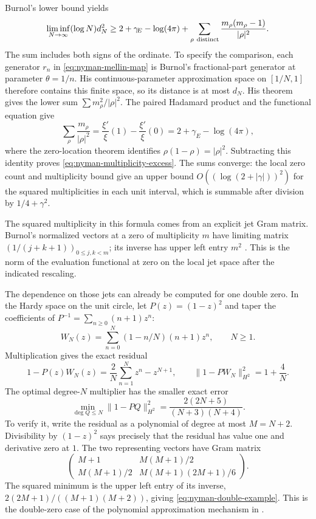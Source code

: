 Burnol's lower bound \cite[Theorem~1.3, p.~4; Section~5,
pp.~14--16]{burnol2002} yields
\begin{equation}\label{eq:nyman-multiplicity-excess}
 \liminf_{N\to\infty}(\log N)d_N^2
 \ge 2+\gamma_{\!E}-\log(4\pi)
   +\sum_{\rho\ {\rm distinct}}
       \frac{m_\rho(m_\rho-1)}{|\rho|^2}.
\end{equation}
The sum includes both signs of the ordinate. To specify the
comparison, each generator \(r_n\) in \eqref{eq:nyman-mellin-map}
is Burnol's fractional-part generator at parameter \(\theta=1/n\).
His continuous-parameter approximation space on \([1/N,1]\)
therefore contains this finite space, so its distance is at most
\(d_N\). His theorem gives the lower sum
\(\sum m_\rho^2/|\rho|^2\). The paired Hadamard product and the
functional equation give
\[
 \sum_\rho\frac{m_\rho}{|\rho|^2}
 =\frac{\xi'}\xi(1)-\frac{\xi'}\xi(0)
 =2+\gamma_{\!E}-\log(4\pi),
\]
where the zero-location theorem identifies
\(\rho(1-\rho)=|\rho|^2\). Subtracting this identity proves
\eqref{eq:nyman-multiplicity-excess}. The sums converge: the
local zero count and multiplicity bound give an upper bound
\(O((\log(2+|\gamma|))^2)\) for the squared multiplicities in
each unit interval, which is summable after division by
\(1/4+\gamma^2\).

The squared multiplicity in this formula comes from an explicit
jet Gram matrix. Burnol's normalized vectors at a zero of
multiplicity \(m\) have limiting matrix
\((1/(j+k+1))_{0\le j,k<m}\); its inverse has upper left entry
\(m^2\) \cite[Theorems~5.3--5.5, pp.~14--16]{burnol2002}.
This is the norm of the evaluation functional at zero on the
local jet space after the indicated rescaling.

The dependence on those jets can already be computed for one
double zero. In the Hardy space on the unit circle, let
\(P(z)=(1-z)^2\) and taper the coefficients of
\(P^{-1}=\sum_{n\ge0}(n+1)z^n\):
\[
 W_N(z)=\sum_{n=0}^N(1-n/N)(n+1)z^n,\qquad N\ge1.
\]
Multiplication gives the exact residual
\[
 1-P(z)W_N(z)=\frac2N\sum_{n=1}^Nz^n-z^{N+1},
 \qquad \|1-PW_N\|_{H^2}^2=1+\frac4N.
\]
The optimal degree-\(N\) multiplier has the smaller exact error
\begin{equation}\label{eq:nyman-double-example}
 \min_{\deg Q\le N}\|1-PQ\|_{H^2}^2
       =\frac{2(2N+5)}{(N+3)(N+4)}.
\end{equation}
To verify it, write the residual as a polynomial of degree at
most \(M=N+2\). Divisibility by \((1-z)^2\) says precisely
that the residual has value one and derivative zero at \(1\).
The two representing vectors have Gram matrix
\[
 \begin{pmatrix}
 M+1&M(M+1)/2\\
 M(M+1)/2&M(M+1)(2M+1)/6
 \end{pmatrix}.
\]
The squared minimum is the upper left entry of its inverse,
\(2(2M+1)/((M+1)(M+2))\), giving
\eqref{eq:nyman-double-example}. This is the double-zero case
of the polynomial approximation mechanism in
\cite[Section~2, pp.~4--6]{burnol2002}.

